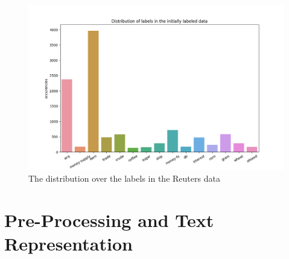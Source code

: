 \begin{figure}
    \includegraphics[scale=0.6]{figures/class-distribution-reuters.png}
    \caption{The distribution over the labels in the Reuters data}
    \label{fig:class-distribution-reuters}
\end{figure}

\section{Pre-Processing and Text Representation}\label{sec:pre-processing}

